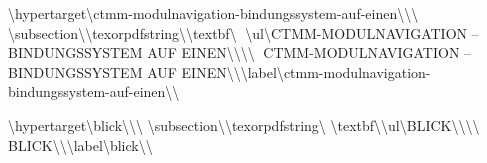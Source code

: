 \textbackslash{}hypertarget\textbackslash{}{ctmm-modulnavigation-bindungssystem-auf-einen\textbackslash{}}\textbackslash{}{\textbackslash{}%
\textbackslash{}subsection\textbackslash{}{\textbackslash{}texorpdfstring\textbackslash{}{\textbackslash{}textbf\textbackslash{}{🧭 \textbackslash{}ul\textbackslash{}{CTMM-MODULNAVIGATION -- BINDUNGSSYSTEM AUF EINEN\textbackslash{}}\textbackslash{}}\textbackslash{}}\textbackslash{}{🧭 CTMM-MODULNAVIGATION -- BINDUNGSSYSTEM AUF EINEN\textbackslash{}}\textbackslash{}}\textbackslash{}label\textbackslash{}{ctmm-modulnavigation-bindungssystem-auf-einen\textbackslash{}}\textbackslash{}}

\textbackslash{}hypertarget\textbackslash{}{blick\textbackslash{}}\textbackslash{}{\textbackslash{}%
\textbackslash{}subsection\textbackslash{}{\textbackslash{}texorpdfstring\textbackslash{}{ \textbackslash{}textbf\textbackslash{}{\textbackslash{}ul\textbackslash{}{BLICK\textbackslash{}}\textbackslash{}}\textbackslash{}}\textbackslash{}{ BLICK\textbackslash{}}\textbackslash{}}\textbackslash{}label\textbackslash{}{blick\textbackslash{}}\textbackslash{}}

